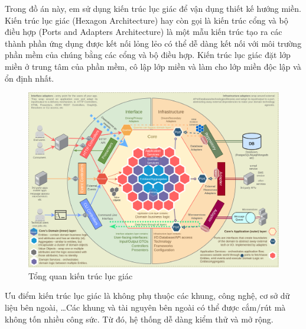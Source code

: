 Trong đồ án này, em sử dụng kiến trúc lục giác để vận dụng thiết kế hướng miền. Kiến trúc lục giác (Hexagon Architecture) hay còn gọi là kiến trúc cổng và bộ điều hợp (Ports and Adapters Architecture) là một mẫu kiến trúc tạo ra các thành phần ứng dụng được kết nối lỏng lẻo có thể dễ dàng kết nối với môi trường phần mềm của chúng bằng các cổng và bộ điều hợp. Kiến trúc lục giác đặt lớp miền ở trung tâm của phần mềm, cô lập lớp miền và làm cho lớp miền độc lập và ổn định nhất.

\begin{figure}[H]

    \centering

    \includegraphics[scale = 0.4]{pictures/_tong_quan_kien_truc_luc_giac/DomainDrivenHexagon.png}

    \caption{Tổng quan kiến trúc lục giác}

\end{figure}
Ưu điểm   kiến trúc lục giác là không phụ thuộc   các khung, công nghệ, cơ sở dữ liệu bên ngoài, \dots Các khung và tài nguyên bên ngoài có thể được cắm/rút mà không tốn nhiều công sức. Từ đó, hệ thống dễ dàng kiểm thử và mở rộng.



